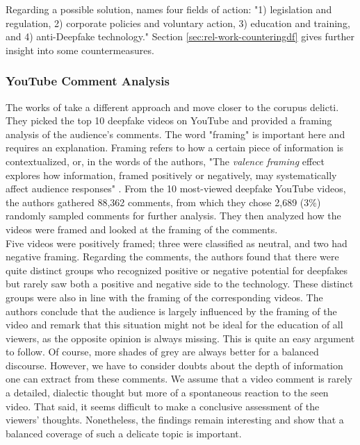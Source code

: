 \documentclass[
  a4paper,  %
  twoside,  %
  bibliography=totoc,
  headsepline,
  cleardoublepage=empty,
  parskip=half,
  draft=false
]{scrbook}
\begin{document}
Regarding a possible solution,  names four fields of action: "1) legislation and regulation, 2) corporate policies and voluntary action, 3) education and training, and 4) anti-Deepfake technology." Section \ref{sec:rel-work-counteringdf} gives further insight into some countermeasures.

\subsubsection*{YouTube Comment Analysis}
The works of \citeauthor{leeBelieveNotBelieve2021} take a different approach and move closer to the corupus delicti. They picked the top 10 deepfake videos on YouTube and provided a framing analysis of the audience's comments. The word "framing" is important here and requires an explanation. Framing refers to how a certain piece of information is contextualized, or, in the words of the authors, "The \textit{valence framing} effect explores how information, framed positively or negatively, may systematically affect audience responses" \cite{leeBelieveNotBelieve2021}. From the 10 most-viewed deepfake YouTube videos, the authors gathered 88,362 comments, from which they chose 2,689 (3\%) randomly sampled comments for further analysis. They then analyzed how the videos were framed and looked at the framing of the comments.\\
Five videos were positively framed; three were classified as neutral, and two had negative framing. Regarding the comments, the authors found that there were quite distinct groups who recognized positive or negative potential for deepfakes but rarely saw both a positive and negative side to the technology. These distinct groups were also in line with the framing of the corresponding videos. The authors conclude that the audience is largely influenced by the framing of the video and remark that this situation might not be ideal for the education of all viewers, as the opposite opinion is always missing. This is quite an easy argument to follow. Of course, more shades of grey are always better for a balanced discourse. However, we have to consider doubts about the depth of information one can extract from these comments. We assume that a video comment is rarely a detailed, dialectic thought but more of a spontaneous reaction to the seen video. That said, it seems difficult to make a conclusive assessment of the viewers' thoughts. Nonetheless, the findings remain interesting and show that a balanced coverage of such a delicate topic is important.
\end{document}

